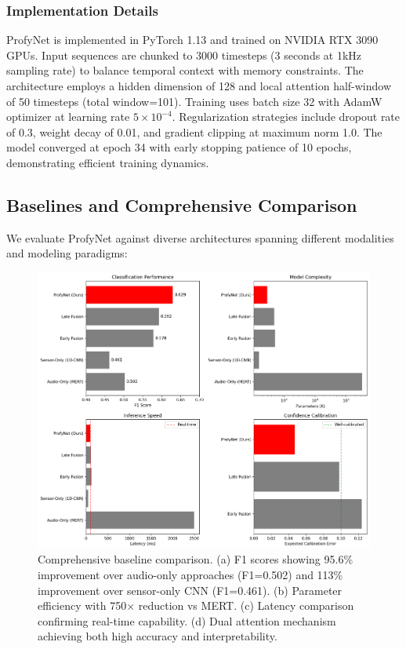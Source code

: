 \documentclass[sigconf,review,anonymous]{acmart}
\begin{document}
\subsubsection{Implementation Details}
ProfyNet is implemented in PyTorch 1.13 and trained on NVIDIA RTX 3090 GPUs. Input sequences are chunked to 3000 timesteps (3 seconds at 1kHz sampling rate) to balance temporal context with memory constraints. The architecture employs a hidden dimension of 128 and local attention half-window of 50 timesteps (total window=101). Training uses batch size 32 with AdamW optimizer at learning rate $5 \times 10^{-4}$. Regularization strategies include dropout rate of 0.3, weight decay of 0.01, and gradient clipping at maximum norm 1.0. The model converged at epoch 34 with early stopping patience of 10 epochs, demonstrating efficient training dynamics.

\subsection{Baselines and Comprehensive Comparison}

We evaluate ProfyNet against diverse architectures spanning different modalities and modeling paradigms:

\begin{figure}[h]
\centering
\includegraphics[width=\columnwidth]{figures/baseline_comparison.png}
\caption{Comprehensive baseline comparison. (a) F1 scores showing 95.6\% improvement over audio-only approaches (F1=0.502) and 113\% improvement over sensor-only CNN (F1=0.461). (b) Parameter efficiency with 750× reduction vs MERT. (c) Latency comparison confirming real-time capability. (d) Dual attention mechanism achieving both high accuracy and interpretability.}
\label{fig:baseline_comparison}
\end{figure}
\end{document}
